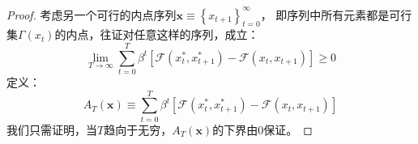 \begin{proof}
    考虑另一个可行的内点序列$\mathbf{x} \equiv\left\{x_{t+1}\right\}_{t=0}^{\infty}$，
    即序列中所有元素都是可行集$\Gamma(x_t)$的内点，往证对任意这样的序列，成立：
    \begin{equation*}
        \lim _{T \rightarrow \infty} \sum_{t=0}^T \beta^t
            \left[\mathcal{F}\left(x_t^*, x_{t+1}^*\right)-\mathcal{F}\left(x_t, x_{t+1}\right)\right] \geq 0
    \end{equation*}
    定义：
    \begin{equation*}
        A_T(\mathbf{x}) \equiv 
            \sum_{t=0}^T\beta^t\left[\mathcal{F}\left(x_t^*,x_{t+1}^*\right)-\mathcal{F}\left(x_t,x_{t+1}\right)\right]
    \end{equation*}
    我们只需证明，当$T$趋向于无穷，$A_T(\mathbf{x})$的下界由0保证。


\end{proof}
